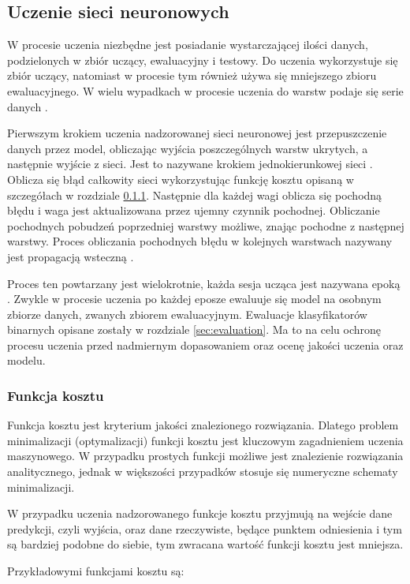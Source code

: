\subsection{Uczenie sieci neuronowych}
W procesie uczenia niezbędne jest posiadanie wystarczającej ilości danych, podzielonych w zbiór uczący, ewaluacyjny i testowy. Do uczenia wykorzystuje się zbiór uczący, natomiast w procesie tym również używa się mniejszego zbioru ewaluacyjnego. W wielu wypadkach w procesie uczenia do warstw podaje się serie danych .
\par
Pierwszym krokiem uczenia nadzorowanej sieci neuronowej jest przepuszczenie danych przez model, obliczając wyjścia poszczególnych warstw ukrytych, a następnie wyjście z sieci. Jest to nazywane krokiem jednokierunkowej sieci . Oblicza się błąd całkowity sieci wykorzystując funkcję kosztu opisaną w szczegółach w rozdziale \ref{sec:cost}. Następnie dla każdej wagi oblicza się pochodną błędu i waga jest aktualizowana przez ujemny czynnik pochodnej. Obliczanie pochodnych  pobudzeń poprzedniej warstwy możliwe, znając pochodne z następnej warstwy. Proces obliczania pochodnych błędu w kolejnych warstwach nazywany jest propagacją wsteczną \cite{lecun1988theoretical}. 
\par
Proces ten powtarzany jest wielokrotnie, każda sesja ucząca jest nazywana epoką . Zwykle w procesie uczenia po każdej eposze ewaluuje się model na osobnym zbiorze danych, zwanych zbiorem ewaluacyjnym. Ewaluacje klasyfikatorów binarnych opisane zostały w rozdziale \ref{sec:evaluation}. Ma to na celu ochronę procesu uczenia przed nadmiernym dopasowaniem oraz ocenę jakości uczenia oraz modelu.  
\subsubsection{Funkcja kosztu}
\label{sec:cost}
Funkcja kosztu jest kryterium jakości znalezionego rozwiązania. Dlatego problem minimalizacji (optymalizacji) funkcji kosztu jest kluczowym zagadnieniem uczenia maszynowego. W przypadku prostych funkcji możliwe jest znalezienie rozwiązania analitycznego, jednak w większości przypadków stosuje się numeryczne schematy minimalizacji.
\par 
W przypadku uczenia nadzorowanego funkcje kosztu przyjmują na wejście dane predykcji, czyli wyjścia, oraz dane rzeczywiste, będące punktem odniesienia i tym są bardziej podobne do siebie, tym zwracana wartość funkcji kosztu jest mniejsza. 
\par Przykładowymi funkcjami kosztu są:


